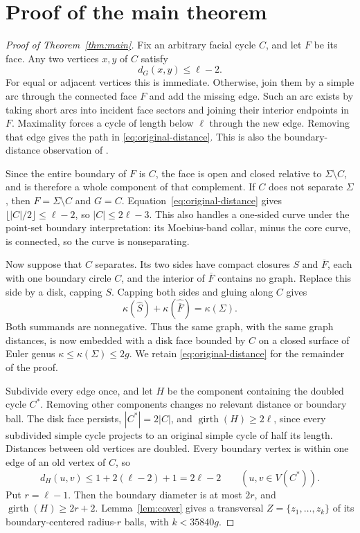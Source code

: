 \documentclass[11pt]{article}
\theoremstyle{remark}
\DeclareMathOperator{\girth}{girth}
\begin{document}
\section{Proof of the main theorem}\label{sec:main-proof}

\begin{proof}[Proof of Theorem~\ref{thm:main}]
Fix an arbitrary facial cycle $C$, and let $F$ be its face.
Any two vertices $x,y$ of $C$ satisfy
\begin{equation}\label{eq:original-distance}
d_G(x,y)\le\ell-2.
\end{equation}
For equal or adjacent vertices this is immediate. Otherwise, join them
by a simple arc through the connected face $F$ and add the missing edge.
Such an arc exists by taking short arcs into incident face sectors and
joining their interior endpoints in $F$. Maximality forces a cycle of
length below $\ell$ through the new edge. Removing that edge gives the
path in \eqref{eq:original-distance}. This is also the boundary-distance
observation of \cite[Lemma~1]{Axenovich}.

Since the entire boundary of $F$ is $C$, the face is open and closed
relative to $\Sigma\setminus C$, and is therefore a whole component of
that complement. If $C$ does not separate $\Sigma$, then
$F=\Sigma\setminus C$ and $G=C$. Equation~\eqref{eq:original-distance}
gives $\lfloor|C|/2\rfloor\le\ell-2$, so $|C|\le2\ell-3$.
This also handles a one-sided curve under the point-set boundary
interpretation: its Moebius-band collar, minus the core curve, is
connected, so the curve is nonseparating.

Now suppose that $C$ separates. Its two sides have compact closures $S$
and $\overline F$, each with one boundary circle $C$, and the interior
of $\overline F$ contains no graph. Replace this side by a disk, capping
$S$. Capping both sides and gluing along $C$ gives
\[
\kappa(\widehat S)+\kappa(\widehat{\overline F})=\kappa(\Sigma).
\]
Both summands are nonnegative. Thus the same graph, with the same graph
distances, is now embedded with a disk face bounded by $C$ on a closed
surface of Euler genus $\kappa\le\kappa(\Sigma)\le2g$.
We retain \eqref{eq:original-distance} for the remainder of the proof.

Subdivide every edge once, and let $H$ be the component containing the
doubled cycle $C^*$. Removing other components changes no relevant
distance or boundary ball. The disk face persists,
$|C^*|=2|C|$, and $\girth(H)\ge2\ell$, since every subdivided simple cycle
projects to an original simple cycle of half its length. Distances between
old vertices are doubled. Every boundary vertex is within one edge of
an old vertex of $C$, so
\begin{equation}\label{eq:subdivided-distance}
d_H(u,v)\le1+2(\ell-2)+1=2\ell-2
 \qquad(u,v\in V(C^*)).
\end{equation}
Put $r=\ell-1$. Then the boundary diameter is at most $2r$, and
$\girth(H)\ge2r+2$. Lemma~\ref{lem:cover} gives a transversal
$Z=\{z_1,\dots,z_k\}$ of its boundary-centered radius-$r$ balls, with
$k<35840g$.


\end{proof}
\end{document}
